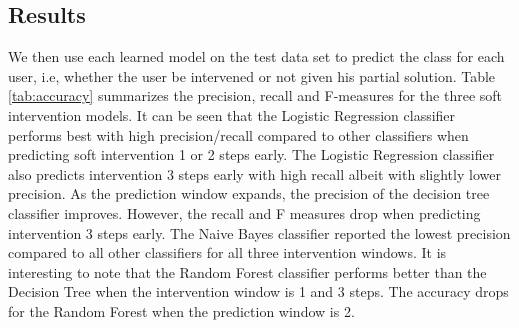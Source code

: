 \subsection*{Results}
We then use each learned model on the test data set to predict the class for each user, i.e, whether the user be intervened or not given his partial solution. Table \ref{tab:accuracy} summarizes the precision, recall and F-measures for the three soft intervention models.
It can be seen that the Logistic Regression classifier performs best with high precision/recall compared to other classifiers when predicting soft intervention 1 or 2 steps early. The Logistic Regression classifier also predicts intervention 3 steps early with high recall albeit with slightly lower precision. As the prediction window expands, the precision of the decision tree classifier improves. However, the recall and F measures drop when predicting intervention 3 steps early. The Naive Bayes classifier reported the lowest precision compared to all other classifiers for all three intervention windows. It is interesting to note that the Random Forest classifier performs better than the Decision Tree when the intervention window is 1 and 3 steps. The accuracy drops for the Random Forest when the prediction window is 2.

